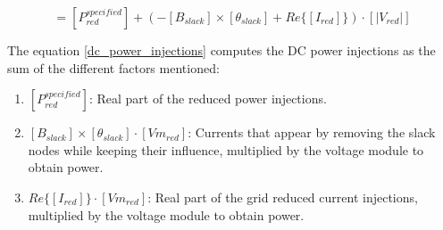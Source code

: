 \documentclass[nols,a4paper,twoside,notoc,fleqn]{tufte-book}
\begin{document}
%
%
%
%
%
%
%
%
%

\begin{equation}
[P_{red}] = \left[P^{specified}_{red}\right] + \left(- [{B}_{slack}] \times [{\theta}_{slack}] + Re \{ [I_{red}] \}  \right) \cdot [|{V}_{red}|]
\label{dc_power_injections}
\end{equation}


The equation \ref{dc_power_injections} computes the DC power injections as the sum of the different factors mentioned:

\begin{enumerate}
	\item $[P^{specified}_{red}]$: Real part of the reduced power injections.
	\item $[{B}_{slack}] \times [{\theta}_{slack}] \cdot [Vm_{red}]$: Currents that appear by removing the slack nodes while keeping their influence, multiplied by the voltage module to obtain power.
	\item $Re \{ [I_{red}] \}  \cdot [Vm_{red}]$: Real part of the grid reduced current injections, multiplied by the voltage module to obtain power.
\end{enumerate}
\end{document}

